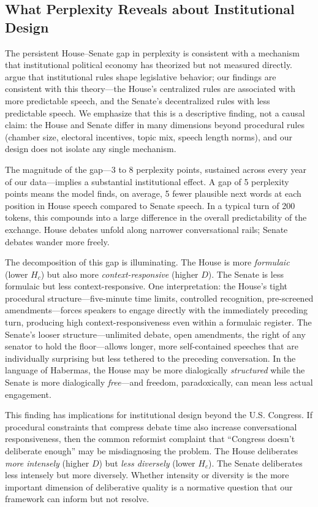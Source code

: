 \documentclass[12pt]{article}
\newcommand{\Hc}{H_c}
\newcommand{\DI}{\mathit{D}}
\begin{document}
\subsection{What Perplexity Reveals about Institutional Design}

The persistent House--Senate gap in perplexity is consistent with a mechanism that institutional political economy has theorized but not measured directly. \citet{perssonTabellini2000, perssonTabellini2003} argue that institutional rules shape legislative behavior; our findings are consistent with this theory---the House's centralized rules are associated with more predictable speech, and the Senate's decentralized rules with less predictable speech. We emphasize that this is a descriptive finding, not a causal claim: the House and Senate differ in many dimensions beyond procedural rules (chamber size, electoral incentives, topic mix, speech length norms), and our design does not isolate any single mechanism.

The magnitude of the gap---3 to 8 perplexity points, sustained across every year of our data---implies a substantial institutional effect. A gap of 5 perplexity points means the model finds, on average, 5 fewer plausible next words at each position in House speech compared to Senate speech. In a typical turn of 200 tokens, this compounds into a large difference in the overall predictability of the exchange. House debates unfold along narrower conversational rails; Senate debates wander more freely.

The decomposition of this gap is illuminating. The House is more \textit{formulaic} (lower $\Hc$) but also more \textit{context-responsive} (higher $\DI$). The Senate is less formulaic but less context-responsive. One interpretation: the House's tight procedural structure---five-minute time limits, controlled recognition, pre-screened amendments---forces speakers to engage directly with the immediately preceding turn, producing high context-responsiveness even within a formulaic register. The Senate's looser structure---unlimited debate, open amendments, the right of any senator to hold the floor---allows longer, more self-contained speeches that are individually surprising but less tethered to the preceding conversation. In the language of Habermas, the House may be more dialogically \textit{structured} while the Senate is more dialogically \textit{free}---and freedom, paradoxically, can mean less actual engagement.

This finding has implications for institutional design beyond the U.S. Congress. If procedural constraints that compress debate time also increase conversational responsiveness, then the common reformist complaint that ``Congress doesn't deliberate enough'' may be misdiagnosing the problem. The House deliberates \textit{more intensely} (higher $\DI$) but \textit{less diversely} (lower $\Hc$). The Senate deliberates less intensely but more diversely. Whether intensity or diversity is the more important dimension of deliberative quality is a normative question that our framework can inform but not resolve.
\end{document}
